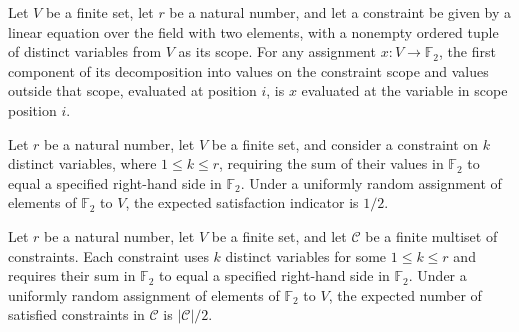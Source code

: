 \begin{theorem}
\label{FABL.maxLinearScopeSplitEquiv_fst_apply}
\leanok
{}
Let $V$ be a finite set, let $r$ be a natural number, and let a constraint be given by a
linear equation over the field with two elements, with a nonempty ordered tuple of
distinct variables from $V$ as its scope. For any assignment $x:V\to\mathbb{F}_2$, the
first component of its decomposition into values on the constraint scope and values
outside that scope, evaluated at position $i$, is $x$ evaluated at the variable in scope
position $i$.
\end{theorem}

\begin{theorem}
\label{FABL.expect_satisfiedIndicator_maxLinear}
\leanok
{}
Let $r$ be a natural number, let $V$ be a finite set, and consider a constraint on $k$
distinct variables, where $1\le k\le r$, requiring the sum of their values in
$\mathbb{F}_2$ to equal a specified right-hand side in $\mathbb{F}_2$. Under a uniformly
random assignment of elements of $\mathbb{F}_2$ to $V$, the expected satisfaction
indicator is $1/2$.
\end{theorem}

\begin{theorem}
\label{FABL.expect_satisfiedIndicators_maxLinear}
\leanok
{}
Let $r$ be a natural number, let $V$ be a finite set, and let $\mathcal{C}$ be a finite
multiset of constraints. Each constraint uses $k$ distinct variables for some $1\le k\le
r$ and requires their sum in $\mathbb{F}_2$ to equal a specified right-hand side in
$\mathbb{F}_2$. Under a uniformly random assignment of elements of $\mathbb{F}_2$ to
$V$, the expected number of satisfied constraints in $\mathcal{C}$ is $|\mathcal{C}|/2$.
\end{theorem}

